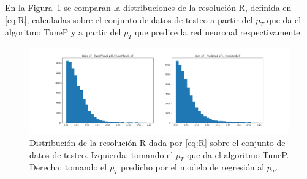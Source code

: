 En la Figura~\ref{fig:R_predicted} se comparan la distribuciones de la resoluci\'on R, definida en \eqref{eq:R}, calculadas sobre el conjunto de datos de testeo a partir del $p_{T}$ que da el algoritmo TuneP y a partir del $p_{T}$ que predice la red neuronal respectivamente.

\begin{figure}[h]
\centering
\includegraphics[width=1.1\textwidth]{figures/R_predicted.png}
\caption{Distribuci\'on de la resoluci\'on R dada por \eqref{eq:R} sobre el conjunto de datos de testeo. Izquierda: tomando el $p_{T}$ que da el algoritmo TuneP. Derecha: tomando el $p_{T}$ predicho por el modelo de regresi\'on al $p_{T}$.}
\label{fig:R_predicted}        
\end{figure}

\clearpage
